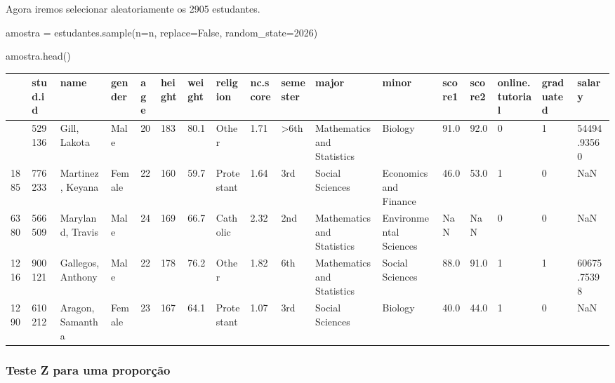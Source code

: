 \documentclass[
  letterpaper,
  DIV=11,
  numbers=noendperiod]{scrreprt}
\newenvironment{Shaded}{\begin{snugshade}}{\end{snugshade}}
\newcommand{\DecValTok}[1]{\textcolor[rgb]{0.68,0.00,0.00}{#1}}
\newcommand{\NormalTok}[1]{\textcolor[rgb]{0.00,0.23,0.31}{#1}}
\newcommand{\OperatorTok}[1]{\textcolor[rgb]{0.37,0.37,0.37}{#1}}
\newcommand{\VariableTok}[1]{\textcolor[rgb]{0.07,0.07,0.07}{#1}}
\begin{document}
Agora iremos selecionar aleatoriamente os 2905 estudantes.

\begin{Shaded}
\begin{Highlighting}[]
\NormalTok{amostra }\OperatorTok{=}\NormalTok{ estudantes.sample(n}\OperatorTok{=}\NormalTok{n, replace}\OperatorTok{=}\VariableTok{False}\NormalTok{, random\_state}\OperatorTok{=}\DecValTok{2026}\NormalTok{) }

\NormalTok{amostra.head()}
\end{Highlighting}
\end{Shaded}

\begin{longtable}[]{@{}lllllllllllllllll@{}}
\toprule\noalign{}
& stud.id & name & gender & age & height & weight & religion & nc.score
& semester & major & minor & score1 & score2 & online.tutorial &
graduated & salary \\
\midrule\noalign{}
\endhead
\bottomrule\noalign{}
\endlastfoot
5101 & 529136 & Gill, Lakota & Male & 20 & 183 & 80.1 & Other & 1.71 &
\textgreater6th & Mathematics and Statistics & Biology & 91.0 & 92.0 & 0
& 1 & 54494.93560 \\
1885 & 776233 & Martinez, Keyana & Female & 22 & 160 & 59.7 & Protestant
& 1.64 & 3rd & Social Sciences & Economics and Finance & 46.0 & 53.0 & 1
& 0 & NaN \\
6380 & 566509 & Maryland, Travis & Male & 24 & 169 & 66.7 & Catholic &
2.32 & 2nd & Mathematics and Statistics & Environmental Sciences & NaN &
NaN & 0 & 0 & NaN \\
1216 & 900121 & Gallegos, Anthony & Male & 22 & 178 & 76.2 & Other &
1.82 & 6th & Mathematics and Statistics & Social Sciences & 88.0 & 91.0
& 1 & 1 & 60675.75398 \\
1290 & 610212 & Aragon, Samantha & Female & 23 & 167 & 64.1 & Protestant
& 1.07 & 3rd & Social Sciences & Biology & 40.0 & 44.0 & 1 & 0 & NaN \\
\end{longtable}

\subsubsection{Teste Z para uma
proporção}\label{teste-z-para-uma-proporuxe7uxe3o}
\end{document}
